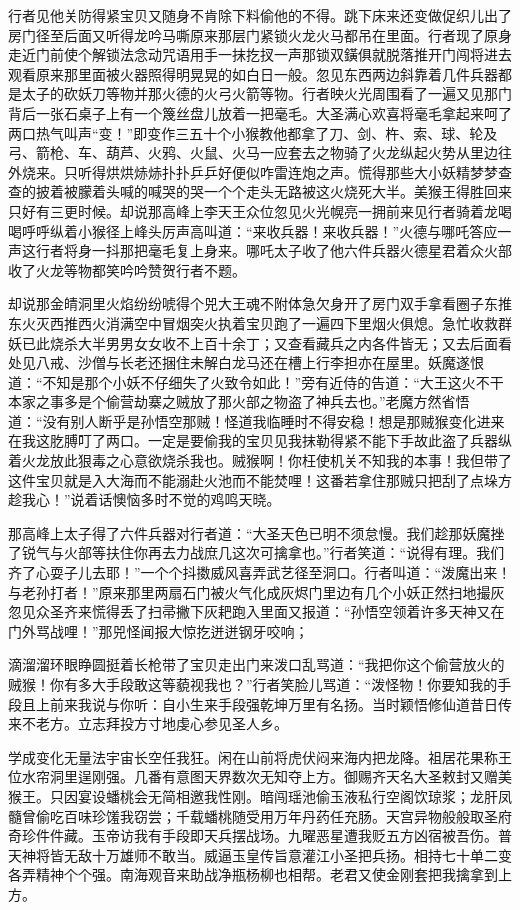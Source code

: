 \documentclass[12pt,UTF8]{ctexbook}
\begin{document}
行者见他关防得紧宝贝又随身不肯除下料偷他的不得。跳下床来还变做促织儿出了房门径至后面又听得龙吟马嘶原来那层门紧锁火龙火马都吊在里面。行者现了原身走近门前使个解锁法念动咒语用手一抹扢扠一声那锁双鐄俱就脱落推开门闯将进去观看原来那里面被火器照得明晃晃的如白日一般。忽见东西两边斜靠着几件兵器都是太子的砍妖刀等物并那火德的火弓火箭等物。行者映火光周围看了一遍又见那门背后一张石桌子上有一个篾丝盘儿放着一把毫毛。大圣满心欢喜将毫毛拿起来呵了两口热气叫声“变！”即变作三五十个小猴教他都拿了刀、剑、杵、索、球、轮及弓、箭枪、车、葫芦、火鸦、火鼠、火马一应套去之物骑了火龙纵起火势从里边往外烧来。只听得烘烘焃焃扑扑乒乒好便似咋雷连炮之声。慌得那些大小妖精梦梦查查的披着被朦着头喊的喊哭的哭一个个走头无路被这火烧死大半。美猴王得胜回来只好有三更时候。却说那高峰上李天王众位忽见火光幌亮一拥前来见行者骑着龙喝喝呼呼纵着小猴径上峰头厉声高叫道：“来收兵器！来收兵器！”火德与哪吒答应一声这行者将身一抖那把毫毛复上身来。哪吒太子收了他六件兵器火德星君着众火部收了火龙等物都笑吟吟赞贺行者不题。

却说那金皘洞里火焰纷纷唬得个兕大王魂不附体急欠身开了房门双手拿看圈子东推东火灭西推西火消满空中冒烟突火执着宝贝跑了一遍四下里烟火俱熄。急忙收救群妖已此烧杀大半男男女女收不上百十余丁；又查看藏兵之内各件皆无；又去后面看处见八戒、沙僧与长老还捆住未解白龙马还在槽上行李担亦在屋里。妖魔遂恨道：“不知是那个小妖不仔细失了火致令如此！”旁有近侍的告道：“大王这火不干本家之事多是个偷营劫寨之贼放了那火部之物盗了神兵去也。”老魔方然省悟道：“没有别人断乎是孙悟空那贼！怪道我临睡时不得安稳！想是那贼猴变化进来在我这肐膊叮了两口。一定是要偷我的宝贝见我抹勒得紧不能下手故此盗了兵器纵着火龙放此狠毒之心意欲烧杀我也。贼猴啊！你枉使机关不知我的本事！我但带了这件宝贝就是入大海而不能溺赴火池而不能焚哩！这番若拿住那贼只把刮了点垛方趁我心！”说着话懊恼多时不觉的鸡鸣天晓。

那高峰上太子得了六件兵器对行者道：“大圣天色已明不须怠慢。我们趁那妖魔挫了锐气与火部等扶住你再去力战庶几这次可擒拿也。”行者笑道：“说得有理。我们齐了心耍子儿去耶！”一个个抖擞威风喜弄武艺径至洞口。行者叫道：“泼魔出来！与老孙打者！”原来那里两扇石门被火气化成灰烬门里边有几个小妖正然扫地撮灰忽见众圣齐来慌得丢了扫帚撇下灰耙跑入里面又报道：“孙悟空领着许多天神又在门外骂战哩！”那兕怪闻报大惊扢迸迸钢牙咬响；

滴溜溜环眼睁圆挺着长枪带了宝贝走出门来泼口乱骂道：“我把你这个偷营放火的贼猴！你有多大手段敢这等藐视我也？”行者笑脸儿骂道：“泼怪物！你要知我的手段且上前来我说与你听：自小生来手段强乾坤万里有名扬。当时颖悟修仙道昔日传来不老方。立志拜投方寸地虔心参见圣人乡。

学成变化无量法宇宙长空任我狂。闲在山前将虎伏闷来海内把龙降。祖居花果称王位水帘洞里逞刚强。几番有意图天界数次无知夺上方。御赐齐天名大圣敕封又赠美猴王。只因宴设蟠桃会无简相邀我性刚。暗闯瑶池偷玉液私行空阁饮琼浆；龙肝凤髓曾偷吃百味珍馐我窃尝；千载蟠桃随受用万年丹药任充肠。天宫异物般般取圣府奇珍件件藏。玉帝访我有手段即天兵摆战场。九曜恶星遭我贬五方凶宿被吾伤。普天神将皆无敌十万雄师不敢当。威逼玉皇传旨意灌江小圣把兵扬。相持七十单二变各弄精神个个强。南海观音来助战净瓶杨柳也相帮。老君又使金刚套把我擒拿到上方。
\end{document}
